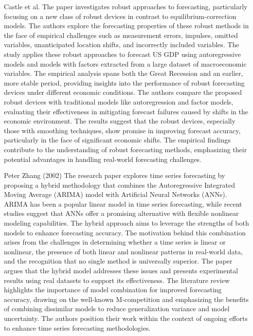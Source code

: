         Castle et al. \cite{castle2015} The paper investigates robust approaches to forecasting, particularly focusing on a new class of robust devices in contrast to equilibrium-correction models. The authors explore the forecasting properties of these robust methods in the face of empirical challenges such as measurement errors, impulses, omitted variables, unanticipated location shifts, and incorrectly included variables. The study applies these robust approaches to forecast US GDP using autoregressive models and models with factors extracted from a large dataset of macroeconomic variables. The empirical analysis spans both the Great Recession and an earlier, more stable period, providing insights into the performance of robust forecasting devices under different economic conditions. The authors compare the proposed robust devices with traditional models like autoregression and factor models, evaluating their effectiveness in mitigating forecast failures caused by shifts in the economic environment. The results suggest that the robust devices, especially those with smoothing techniques, show promise in improving forecast accuracy, particularly in the face of significant economic shifts. The empirical findings contribute to the understanding of robust forecasting methods, emphasizing their potential advantages in handling real-world forecasting challenges.
        
        Peter Zhang (2002) \cite{zhang2003} The research paper explores time series forecasting by proposing a hybrid methodology that combines the Autoregressive Integrated Moving Average (ARIMA) model with Artificial Neural Networks (ANNs). ARIMA has been a popular linear model in time series forecasting, while recent studies suggest that ANNs offer a promising alternative with flexible nonlinear modeling capabilities. The hybrid approach aims to leverage the strengths of both models to enhance forecasting accuracy. The motivation behind this combination arises from the challenges in determining whether a time series is linear or nonlinear, the presence of both linear and nonlinear patterns in real-world data, and the recognition that no single method is universally superior. The paper argues that the hybrid model addresses these issues and presents experimental results using real datasets to support its effectiveness. The literature review highlights the importance of model combination for improved forecasting accuracy, drawing on the well-known M-competition and emphasizing the benefits of combining dissimilar models to reduce generalization variance and model uncertainty. The authors position their work within the context of ongoing efforts to enhance time series forecasting methodologies.

